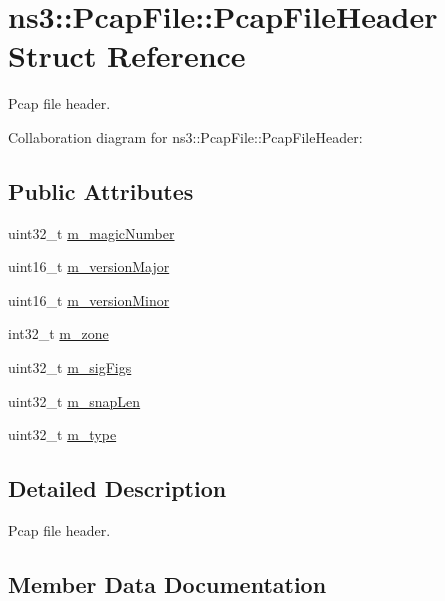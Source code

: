 \hypertarget{structns3_1_1PcapFile_1_1PcapFileHeader}{}\section{ns3\+:\+:Pcap\+File\+:\+:Pcap\+File\+Header Struct Reference}
\label{structns3_1_1PcapFile_1_1PcapFileHeader}


Pcap file header.  




Collaboration diagram for ns3\+:\+:Pcap\+File\+:\+:Pcap\+File\+Header\+:
\subsection*{Public Attributes}
\begin{DoxyCompactItemize}
\item 
uint32\+\_\+t \hyperlink{structns3_1_1PcapFile_1_1PcapFileHeader_a53c161466b08f8aadc7ec382daf85add}{m\+\_\+magic\+Number}
\item 
uint16\+\_\+t \hyperlink{structns3_1_1PcapFile_1_1PcapFileHeader_aad229620708f0556447252a2c737788d}{m\+\_\+version\+Major}
\item 
uint16\+\_\+t \hyperlink{structns3_1_1PcapFile_1_1PcapFileHeader_afb6cdefec3947135b53c8bbe05628927}{m\+\_\+version\+Minor}
\item 
int32\+\_\+t \hyperlink{structns3_1_1PcapFile_1_1PcapFileHeader_aaa76da3051b3fe9cf8b37129d5510b1c}{m\+\_\+zone}
\item 
uint32\+\_\+t \hyperlink{structns3_1_1PcapFile_1_1PcapFileHeader_a76f5e60aad3d3cad6a316aa37186ac19}{m\+\_\+sig\+Figs}
\item 
uint32\+\_\+t \hyperlink{structns3_1_1PcapFile_1_1PcapFileHeader_acadba930824bddafabd88a0b3f5e3289}{m\+\_\+snap\+Len}
\item 
uint32\+\_\+t \hyperlink{structns3_1_1PcapFile_1_1PcapFileHeader_ac3c13f02372a4db169cea201f028b4c1}{m\+\_\+type}
\end{DoxyCompactItemize}


\subsection{Detailed Description}
Pcap file header. 

\subsection{Member Data Documentation}
